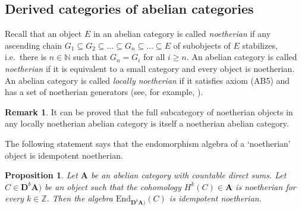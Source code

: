 \documentclass[a4paper,11pt,twoside]{amsart}
\newtheorem{prop}[thm]{Proposition}
\numberwithin{equation}{section}
\theoremstyle{definition}
\newtheorem{remark}[thm]{Remark}
\begin{document}
\subsection{Derived categories of abelian categories}\label{subsec:intermed}
Recall that an object $E$ in an abelian category is called
\emph{noetherian} if any ascending chain $G_1\subseteq
G_2\subseteq\ldots\subseteq G_n\subseteq\ldots\subseteq E$ of
subobjects of $E$ stabilizes, i.e.\ there is $n\in{\mathbb{N}}$ such that
$G_n=G_i$ for all $i\ge n.$ An abelian category is called \emph{noetherian} if it is equivalent to a small category and every object is noetherian. An abelian category is called \emph{locally noetherian} if it satisfies axiom (AB5) and has a set of noetherian generators
(see, for example, \cite{Po}).

\begin{remark}\label{rmk:locallynoeth}
It can be proved that the full subcategory of noetherian objects in any locally noetherian
abelian category is itself a noetherian abelian category.
\end{remark}

The following statement says that the endomorphism algebra of  a `noetherian' object is idempotent noetherian.

\begin{prop}\label{prop:idnoeth}
Let ${{\mathbf{{A}}}}$ be an abelian category with countable direct sums. Let
$C\in{\mathbf{D}^{b}}{{\mathbf{{A}}}})$ be an object such that the cohomology
$H^k(C)\in{{\mathbf{{A}}}}$ is noetherian
for every $k\in{\mathbb{Z}}.$ Then the algebra ${\mathrm{End}}_{{\mathbf{D}^{b}}{{\mathbf{{A}}}})}(C)$ is idempotent noetherian.
\end{prop}
\end{document}
